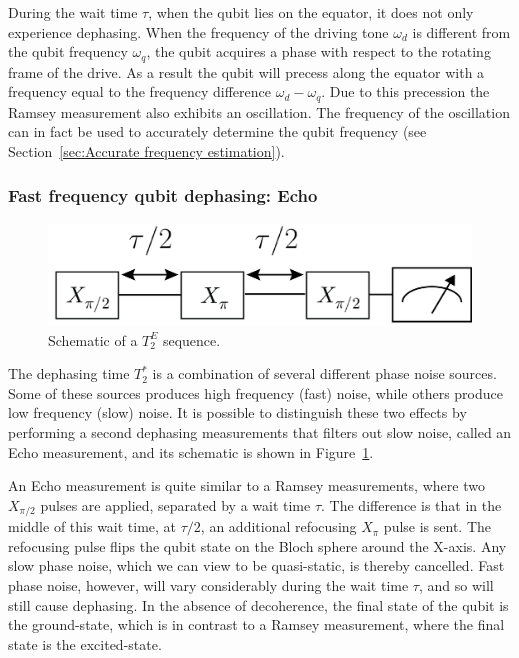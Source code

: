           During the wait time $\tau$, when the qubit lies on the equator, it does not only experience dephasing. When the frequency of the driving tone $\omega_d$ is different from the qubit frequency $\omega_q$, the qubit acquires a phase with respect to the rotating frame of the drive. As a result the qubit will precess along the equator with a frequency equal to the frequency difference $\omega_d - \omega_q$. Due to this precession the Ramsey measurement also exhibits an oscillation. The frequency of the oscillation can in fact be used to accurately determine the qubit frequency (see Section~\ref{sec:Accurate frequency estimation}).

        \subsubsection{Fast frequency qubit dephasing: Echo}

          \begin{figure}
            \begin{center}
            \vspace{-30pt}
              \includegraphics[width=\textwidth]{../Figures/Qubit characterization/T2echo decoherence.png}
            \end{center}
            \vspace{-20 pt}
            \caption{Schematic of a $T_2^E$ sequence.}
            \label{fig:T2echo schematic}
          \end{figure}

          The dephasing time $T_2^*$ is a combination of several different phase noise sources. Some of these sources produces high frequency (fast) noise, while others produce low frequency (slow) noise. It is possible to distinguish these two effects by performing a second dephasing measurements that filters out slow noise, called an Echo measurement, and its schematic is shown in Figure~\ref{fig:T2echo schematic}.

          An Echo measurement is quite similar to a Ramsey measurements, where two $X_{\pi/2}$ pulses are applied, separated by a wait time $\tau$. The difference is that in the middle of this wait time, at $\tau/2$, an additional refocusing $X_{\pi}$ pulse is sent. The refocusing pulse flips the qubit state on the Bloch sphere around the X-axis. Any slow phase noise, which we can view to be quasi-static, is thereby cancelled. Fast phase noise, however, will vary considerably during the wait time $\tau$, and so will still cause dephasing. In the absence of decoherence, the final state of the qubit is the ground-state, which is in contrast to a Ramsey measurement, where the final state is the excited-state.

